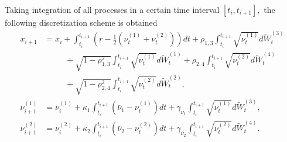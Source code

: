 \documentclass[]{interact}
\theoremstyle{plain}%
\theoremstyle{definition}
\theoremstyle{remark}
\begin{document}
Taking integration of all processes in a certain time interval $[t_i,t_{i+1}],$ the following discretization scheme is obtained
\begin{align*} 
x_{i+1} &= x_{i} + \int_{t_{i}}^{t_{i+1}} \left(r - \frac{1}{2} \left(\nu_{t}^{(1)} + \nu_{t}^{(2)}\right)\right) dt + \rho_{1,3} \int_{t_{i}}^{t_{i+1}} \sqrt{\nu_{t}^{(1)}} d \widetilde{W}_t^{(3)}  \\
&\phantom{= x_{i2}} + \sqrt{1 - \rho_{1,3}^{2}} \int_{t_{i}}^{t_{i+1}} \sqrt{\nu_{t}^{(1)}} d \widetilde{W}_t^{(1)} + \rho_{2,4} \int_{t_{i}}^{t_{i+1}} \sqrt{\nu_{t}^{(2)}} d \widetilde{W}_t^{(4)}  \\
&\phantom{= x_{i2}} + \sqrt{1 - \rho_{2,4}^{2}} \int_{t_{i}}^{t_{i+1}} \sqrt{\nu_{t}^{(2)}} d \widetilde{W}_t^{(2)}, \\ 
\nu_{i+1}^{(1)} &= \nu_{i}^{(1)} + \kappa_1 \int_{t_{i}}^{t_{i+1}} \left(\bar{\nu}_{1} - \nu_{t}^{(1)}\right) dt + \gamma_{\nu_{1}} \int_{t_{i}}^{t_{i+1}} \sqrt{\nu_{t}^{(1)}} d \widetilde{W}_t^{(3)},  \\
\nu_{i+1}^{(2)} &= \nu_{i}^{(2)} + \kappa_2 \int_{t_{i}}^{t_{i+1}} \left(\bar{\nu}_{2} - \nu_{t}^{(2)}\right) dt + \gamma_{\nu_{2}} \int_{t_{i}}^{t_{i+1}} \sqrt{\nu_{t}^{(2)}} d \widetilde{W}_t^{(4)}. 
\end{align*}
\end{document}
